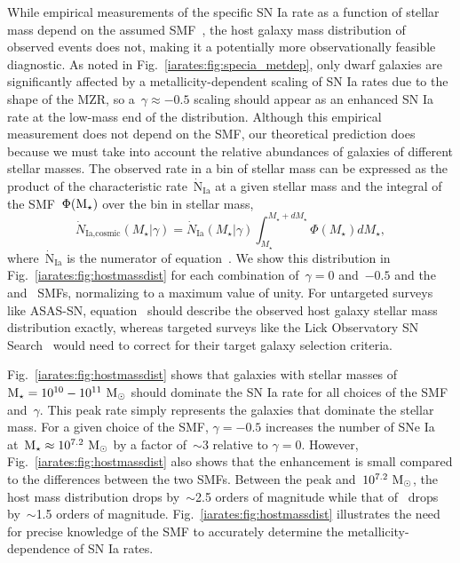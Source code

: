 While empirical measurements of the specific SN Ia rate as a function of
stellar mass depend on the assumed SMF~\citep{Gandhi2022}, the host galaxy
mass distribution of observed events does not, making it a potentially more
observationally feasible diagnostic.
As noted in Fig.~\ref{iarates:fig:specia_metdep}, only dwarf galaxies are
significantly affected by a metallicity-dependent scaling of SN Ia rates due to
the shape of the MZR, so a~$\gamma \approx -0.5$ scaling should appear as an
enhanced SN Ia rate at the low-mass end of the distribution.
Although this empirical measurement does not depend on the SMF, our theoretical
prediction does because we must take into account the relative abundances of
galaxies of different stellar masses.
The observed rate in a bin of stellar mass can be expressed as the product
of the characteristic rate~$\dot{\text{N}}_\text{Ia}$ at a given stellar mass
and the integral of the SMF~$\Phi(\text{M}_\star)$ over the bin in stellar mass,
\begin{equation}
\dot{N}_\text{Ia,cosmic}(M_\star | \gamma) = \dot{N}_\text{Ia}(M_\star | \gamma)
\int_{M_\star}^{M_\star + dM_\star} \Phi(M_\star) dM_\star,
\label{iarates:eq:hostmassdist}
\end{equation}
where~$\dot{\text{N}}_\text{Ia}$ is the numerator of equation~.
We show this distribution in Fig.~\ref{iarates:fig:hostmassdist} for each combination
of~$\gamma = 0$ and~$-0.5$ and the~\citet{Bell2003} and~\citet{Baldry2012} SMFs,
normalizing to a maximum value of unity.
For untargeted surveys like ASAS-SN, equation~ should
describe the observed host galaxy stellar mass distribution exactly, whereas
targeted surveys like the Lick Observatory SN Search~\citep[LOSS;][]{Li2000,
Filippenko2001} would need to correct for their target galaxy selection
criteria.
\par
Fig.~\ref{iarates:fig:hostmassdist} shows that galaxies with stellar masses of
$\text{M}_\star = 10^{10} - 10^{11}~\text{M}_\odot$ should dominate the SN Ia rate for all
choices of the SMF and~$\gamma$.
This peak rate simply represents the galaxies that dominate the stellar mass.
For a given choice of the SMF, $\gamma = -0.5$ increases the number of SNe Ia
at~$\text{M}_\star \approx 10^{7.2}~\text{M}_\odot$ by a factor of~$\sim$3 relative to
$\gamma = 0$.
However, Fig.~\ref{iarates:fig:hostmassdist} also shows that the enhancement is small
compared to the differences between the two SMFs.
Between the peak and~$10^{7.2}~\text{M}_\odot$, the ~\citet{Bell2003} host mass
distribution drops by~$\sim$2.5 orders of magnitude while
that of~\citet{Baldry2012} drops by~$\sim$1.5 orders of magnitude.
Fig.~\ref{iarates:fig:hostmassdist} illustrates the need for precise knowledge of the
SMF to accurately determine the metallicity-dependence of SN Ia rates.
